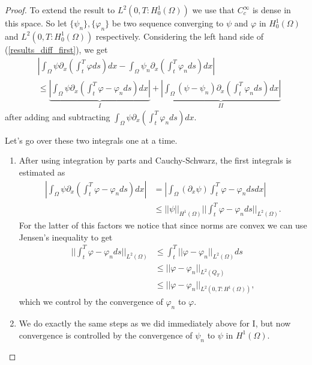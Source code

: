 \documentclass[11pt, a4paper]{article}
\begin{document}
\begin{appendix}
\begin{proof}
To extend the result to $L^2(0,T:H_0^1 (\Omega))$ we use that $C_c^\infty$ is dense in this space. So let $\{\psi_n\},\{\varphi_n\}$ be two sequence converging to $\psi$ and $\varphi$ in $H^1_0(\Omega)$ and $L^2(0,T:H_0^1(\Omega))$ respectively. Considering the left hand side of (\ref{results_diff_first}), we get
\begin{align*}
&\left|\int_{\Omega}\psi \partial_x \left( \int_t^T\varphi ds \right)dx - \int_{\Omega}\psi_n \partial_x \left( \int_t^T \varphi_n ds \right) dx \right| \\
&\leq \underbrace{\left| \int_{\Omega} \psi \partial_x \left(\int_t^T \varphi - \varphi_n ds\right)dx \right| }_{I} + \underbrace{\left| \int_{\Omega}(\psi - \psi_n)\partial_x\left(\int_t^T \varphi_n ds\right) dx \right|}_{II}
\end{align*}
after adding and subtracting $\int_\Omega \psi \partial_x \left(\int_t^T \varphi_n ds\right)dx$.

Let's go over these two integrals one at a time.
\begin{enumerate}[I:]

\item After using integration by parts and Cauchy-Schwarz, the first integrals is estimated as
\begin{align*}
\left| \int_{\Omega} \psi \partial_x \left(\int_t^T \varphi - \varphi_n ds\right)dx \right| &= \left| \int_\Omega (\partial_x \psi) \int_t^T\varphi - \varphi_n ds dx \right| \\
&\leq ||\psi||_{H^1(\Omega)}\big|\big| \int_t^T \varphi - \varphi_n ds \big|\big|_{L^2(\Omega)}.
\end{align*}
For the latter of this factors we notice that since norms are convex we can use Jensen's inequality \citep[Theorem 2, p. 705]{evans} to get
\begin{align*}
\big|\big| \int_t^T \varphi - \varphi_n ds \big|\big|_{L^2(\Omega)} &\leq \int_t^T ||\varphi - \varphi_n||_{L^2(\Omega)}ds \\
&\leq ||\varphi - \varphi_n||_{L^2(Q_T)} \\
&\leq ||\varphi - \varphi_n||_{L^2(0,T: H^1(\Omega))},
\end{align*}
which we control by the convergence of $\varphi_n$ to $\varphi$.

\item We do exactly the same steps as we did immediately above for I, but now convergence is controlled by the convergence of $\psi_n$ to $\psi$ in $H^1(\Omega)$.


\end{enumerate}
\end{proof}
\end{appendix}
\end{document}
